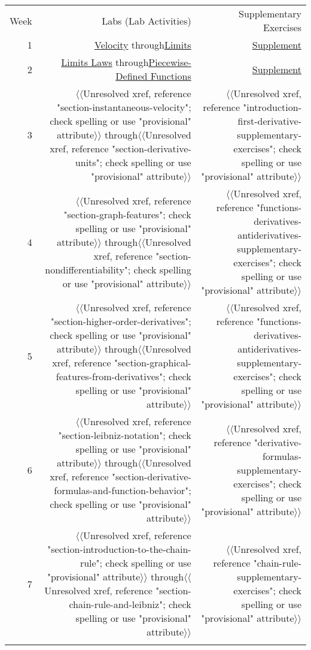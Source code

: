\documentclass[12pt,]{book}
\theoremstyle{plain}
\theoremstyle{definition}
\theoremstyle{definition}
\theoremstyle{definition}
\theoremstyle{definition}
\theoremstyle{definition}
\numberwithin{equation}{section}
\newcommand{\hrulemedium}{\noalign{\hrule height 0.07em}}
\newcommand{\hrulethick} {\noalign{\hrule height 0.11em}}
\begin{document}
\leavevmode%
\begin{table}
\centering
\begin{tabular}{r r r }\hrulethick
Week&Labs (Lab Activities)&Supplementary Exercises\tabularnewline\hrulemedium
1&\hyperref[section-velocity]{Velocity} through\hyperref[section-limits]{Limits}&\hyperref[rates-of-change-supplementary-exercises]{Supplement}\tabularnewline\hrulemedium
2&\hyperref[section-limit-laws]{Limits Laws} through\hyperref[section-piecewise-defined-functions]{Piecewise-Defined Functions}&\hyperref[limits-and-continuity-supplementary-exercises]{Supplement}\tabularnewline\hrulemedium
3&{$\langle\langle$Unresolved xref, reference "section-instantaneous-velocity"; check spelling or use "provisional" attribute$\rangle\rangle$} through{$\langle\langle$Unresolved xref, reference "section-derivative-units"; check spelling or use "provisional" attribute$\rangle\rangle$}&{$\langle\langle$Unresolved xref, reference "introduction-first-derivative-supplementary-exercises"; check spelling or use "provisional" attribute$\rangle\rangle$}\tabularnewline\hrulemedium
4&{$\langle\langle$Unresolved xref, reference "section-graph-features"; check spelling or use "provisional" attribute$\rangle\rangle$} through{$\langle\langle$Unresolved xref, reference "section-nondifferentiability"; check spelling or use "provisional" attribute$\rangle\rangle$}&{$\langle\langle$Unresolved xref, reference "functions-derivatives-antiderivatives-supplementary-exercises"; check spelling or use "provisional" attribute$\rangle\rangle$}\tabularnewline\hrulemedium
5&{$\langle\langle$Unresolved xref, reference "section-higher-order-derivatives"; check spelling or use "provisional" attribute$\rangle\rangle$} through{$\langle\langle$Unresolved xref, reference "section-graphical-features-from-derivatives"; check spelling or use "provisional" attribute$\rangle\rangle$}&{$\langle\langle$Unresolved xref, reference "functions-derivatives-antiderivatives-supplementary-exercises"; check spelling or use "provisional" attribute$\rangle\rangle$}\tabularnewline\hrulemedium
6&{$\langle\langle$Unresolved xref, reference "section-leibniz-notation"; check spelling or use "provisional" attribute$\rangle\rangle$} through{$\langle\langle$Unresolved xref, reference "section-derivative-formulas-and-function-behavior"; check spelling or use "provisional" attribute$\rangle\rangle$}&{$\langle\langle$Unresolved xref, reference "derivative-formulas-supplementary-exercises"; check spelling or use "provisional" attribute$\rangle\rangle$}\tabularnewline\hrulemedium
7&{$\langle\langle$Unresolved xref, reference "section-introduction-to-the-chain-rule"; check spelling or use "provisional" attribute$\rangle\rangle$} through{$\langle\langle$Unresolved xref, reference "section-chain-rule-and-leibniz"; check spelling or use "provisional" attribute$\rangle\rangle$}&{$\langle\langle$Unresolved xref, reference "chain-rule-supplementary-exercises"; check spelling or use "provisional" attribute$\rangle\rangle$}\tabularnewline\hrulemedium

\end{tabular}
\end{table}
\end{document}
